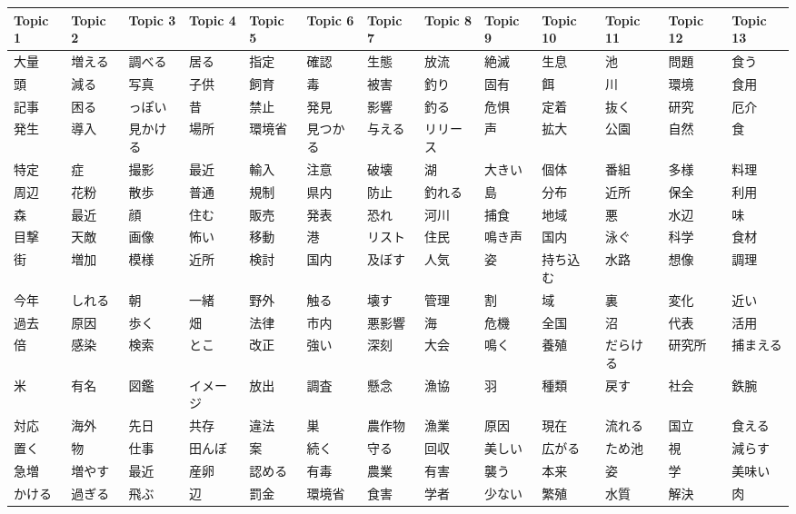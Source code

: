 \begin{table}[ht]
\centering
\begin{tabular}{lllllllllllll}
  \hline
Topic 1 & Topic 2 & Topic 3 & Topic 4 & Topic 5 & Topic 6 & Topic 7 & Topic 8 & Topic 9 & Topic 10 & Topic 11 & Topic 12 & Topic 13 \\ 
  \hline
大量 & 増える & 調べる & 居る & 指定 & 確認 & 生態 & 放流 & 絶滅 & 生息 & 池 & 問題 & 食う \\ 
  頭 & 減る & 写真 & 子供 & 飼育 & 毒 & 被害 & 釣り & 固有 & 餌 & 川 & 環境 & 食用 \\ 
  記事 & 困る & っぽい & 昔 & 禁止 & 発見 & 影響 & 釣る & 危惧 & 定着 & 抜く & 研究 & 厄介 \\ 
  発生 & 導入 & 見かける & 場所 & 環境省 & 見つかる & 与える & リリース & 声 & 拡大 & 公園 & 自然 & 食 \\ 
  特定 & 症 & 撮影 & 最近 & 輸入 & 注意 & 破壊 & 湖 & 大きい & 個体 & 番組 & 多様 & 料理 \\ 
  周辺 & 花粉 & 散歩 & 普通 & 規制 & 県内 & 防止 & 釣れる & 島 & 分布 & 近所 & 保全 & 利用 \\ 
  森 & 最近 & 顔 & 住む & 販売 & 発表 & 恐れ & 河川 & 捕食 & 地域 & 悪 & 水辺 & 味 \\ 
  目撃 & 天敵 & 画像 & 怖い & 移動 & 港 & リスト & 住民 & 鳴き声 & 国内 & 泳ぐ & 科学 & 食材 \\ 
  街 & 増加 & 模様 & 近所 & 検討 & 国内 & 及ぼす & 人気 & 姿 & 持ち込む & 水路 & 想像 & 調理 \\ 
  今年 & しれる & 朝 & 一緒 & 野外 & 触る & 壊す & 管理 & 割 & 域 & 裏 & 変化 & 近い \\ 
  過去 & 原因 & 歩く & 畑 & 法律 & 市内 & 悪影響 & 海 & 危機 & 全国 & 沼 & 代表 & 活用 \\ 
  倍 & 感染 & 検索 & とこ & 改正 & 強い & 深刻 & 大会 & 鳴く & 養殖 & だらける & 研究所 & 捕まえる \\ 
  米 & 有名 & 図鑑 & イメージ & 放出 & 調査 & 懸念 & 漁協 & 羽 & 種類 & 戻す & 社会 & 鉄腕 \\ 
  対応 & 海外 & 先日 & 共存 & 違法 & 巣 & 農作物 & 漁業 & 原因 & 現在 & 流れる & 国立 & 食える \\ 
  置く & 物 & 仕事 & 田んぼ & 案 & 続く & 守る & 回収 & 美しい & 広がる & ため池 & 視 & 減らす \\ 
  急増 & 増やす & 最近 & 産卵 & 認める & 有毒 & 農業 & 有害 & 襲う & 本来 & 姿 & 学 & 美味い \\ 
  かける & 過ぎる & 飛ぶ & 辺 & 罰金 & 環境省 & 食害 & 学者 & 少ない & 繁殖 & 水質 & 解決 & 肉 \\ 

\end{tabular}
\end{table}
